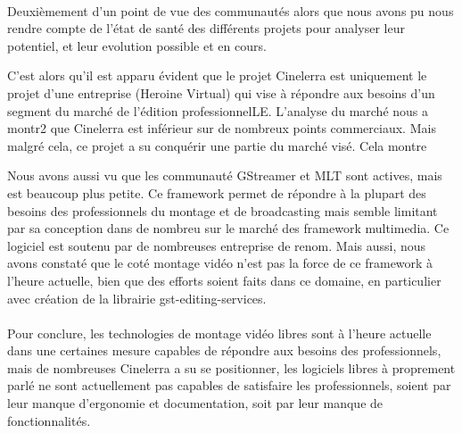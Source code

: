 \paragraph{}

Deuxièmement d'un point de vue des communautés alors que nous avons
pu nous rendre compte de l'état de santé des différents projets pour
analyser leur potentiel, et leur evolution possible et en cours.

C'est alors qu'il est apparu évident que le projet Cinelerra est
uniquement le projet d'une entreprise (Heroine Virtual) qui vise
à répondre aux besoins d'un segment du marché de l'édition
professionnelLE. L'analyse du marché nous a montr2 que Cinelerra
est inférieur sur de nombreux points %
commerciaux.  Mais malgré cela, ce projet a su conquérir une partie
du marché visé. Cela montre %


Nous avons aussi vu que les communauté GStreamer et MLT sont actives,
mais %
est beaucoup plus petite. Ce framework permet de répondre à la plupart
des besoins des professionnels du montage et de broadcasting mais semble
limitant par sa conception dans de nombreu%
sur le marché des framework multimedia. Ce logiciel est soutenu par de
nombreuses entreprise de renom. Mais aussi, nous avons constaté que
le coté montage vidéo n'est pas la force de ce framework à l'heure
actuelle, bien que des efforts soient faits dans ce domaine, en particulier
avec création de la librairie gst-editing-services.

\paragraph{}

Pour conclure, les technologies de montage vidéo libres sont à l'heure
actuelle dans une certaines mesure capables de répondre aux besoins des
professionnels, mais de nombreuses %
Cinelerra a su se positionner, les logiciels libres à proprement parlé
ne sont actuellement pas capables de satisfaire les professionnels,
soient par leur manque d'ergonomie et documentation, soit par leur manque
de fonctionnalités.

